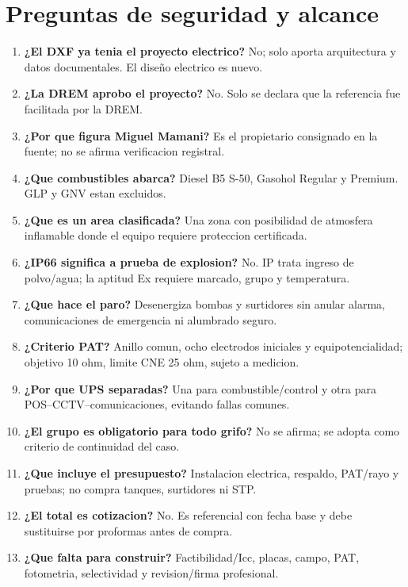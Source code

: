 \documentclass[12pt,letterpaper]{report}
\begin{document}
\chapter*{Preguntas de seguridad y alcance}
\thispagestyle{memoria}
\begin{enumerate}
\item \textbf{¿El DXF ya tenia el proyecto electrico?} No; solo aporta arquitectura y datos documentales. El diseño electrico es nuevo.
\item \textbf{¿La DREM aprobo el proyecto?} No. Solo se declara que la referencia fue facilitada por la DREM.
\item \textbf{¿Por que figura Miguel Mamani?} Es el propietario consignado en la fuente; no se afirma verificacion registral.
\item \textbf{¿Que combustibles abarca?} Diesel B5 S-50, Gasohol Regular y Premium. GLP y GNV estan excluidos.
\item \textbf{¿Que es un area clasificada?} Una zona con posibilidad de atmosfera inflamable donde el equipo requiere proteccion certificada.
\item \textbf{¿IP66 significa a prueba de explosion?} No. IP trata ingreso de polvo/agua; la aptitud Ex requiere marcado, grupo y temperatura.
\item \textbf{¿Que hace el paro?} Desenergiza bombas y surtidores sin anular alarma, comunicaciones de emergencia ni alumbrado seguro.
\item \textbf{¿Criterio PAT?} Anillo comun, ocho electrodos iniciales y equipotencialidad; objetivo 10 ohm, limite CNE 25 ohm, sujeto a medicion.
\item \textbf{¿Por que UPS separadas?} Una para combustible/control y otra para POS--CCTV--comunicaciones, evitando fallas comunes.
\item \textbf{¿El grupo es obligatorio para todo grifo?} No se afirma; se adopta como criterio de continuidad del caso.
\item \textbf{¿Que incluye el presupuesto?} Instalacion electrica, respaldo, PAT/rayo y pruebas; no compra tanques, surtidores ni STP.
\item \textbf{¿El total es cotizacion?} No. Es referencial con fecha base y debe sustituirse por proformas antes de compra.
\item \textbf{¿Que falta para construir?} Factibilidad/Icc, placas, campo, PAT, fotometria, selectividad y revision/firma profesional.
\end{enumerate}
\end{document}
